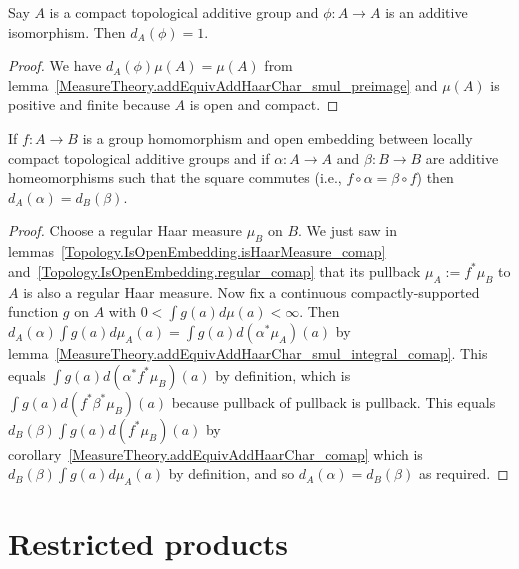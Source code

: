 \begin{lemma}
  \label{MeasureTheory.mulEquivHaarChar_eq_one_of_compactSpace}
  \leanok
  Say $A$ is a compact topological additive group and $\phi:A\to A$ is an additive isomorphism.
Then $d_A(\phi)=1.$
\end{lemma}
\begin{proof}
  We have $d_A(\phi)\mu(A)=\mu(A)$
  from lemma~\ref{MeasureTheory.addEquivAddHaarChar_smul_preimage}
  and $\mu(A)$ is positive and finite because $A$ is open and compact.
\end{proof}

\begin{lemma}
  \label{MeasureTheory.addEquivAddHaarChar_eq_addEquivAddHaarChar_of_isOpenEmbedding}
  \leanok
  If $f:A\to B$ is a group homomorphism and open embedding between locally compact
  topological additive groups and if $\alpha:A\to A$ and $\beta:B\to B$ are additive
  homeomorphisms such that the square commutes (i.e., $f\circ\alpha=\beta\circ f$)
  then $d_A(\alpha)=d_B(\beta)$.
\end{lemma}
\begin{proof}
  \leanok
  Choose a regular Haar measure $\mu_B$ on $B$. We just saw
  in lemmas~\ref{Topology.IsOpenEmbedding.isHaarMeasure_comap}
  and~\ref{Topology.IsOpenEmbedding.regular_comap} that its pullback
  $\mu_A:=f^*\mu_B$ to $A$ is also a regular Haar
  measure. Now fix a continuous compactly-supported function $g$ on $A$ with
  $0<\int g(a)d\mu(a)<\infty$. Then $d_A(\alpha)\int g(a)d\mu_A(a)=\int g(a)d(\alpha^*\mu_A)(a)$
  by lemma~\ref{MeasureTheory.addEquivAddHaarChar_smul_integral_comap}.
  This equals $\int g(a)d(\alpha^* f^*\mu_B)(a)$ by definition,
  which is $\int g(a)d(f^*\beta^*\mu_B)(a)$ because pullback of pullback is pullback.
  This equals $d_B(\beta)\int g(a) d(f^*\mu_B)(a)$ by
  corollary~\ref{MeasureTheory.addEquivAddHaarChar_comap}
  which is $d_B(\beta)\int g(a)d\mu_A(a)$ by definition,
  and so $d_A(\alpha)=d_B(\beta)$ as required.
\end{proof}

\section{Restricted products}

